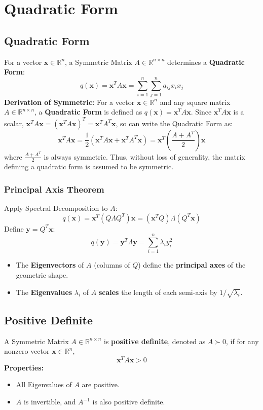 \documentclass{article}
\begin{document}
\newpage
\section{Quadratic Form}

\subsection{Quadratic Form}

For a vector $\mathbf{x} \in \mathbb{R}^n$, a Symmetric Matrix $A \in \mathbb{R}^{n \times n}$ determines a \textbf{Quadratic Form}:
\[
    q(\mathbf{x}) = \mathbf{x}^T A \mathbf{x} = \sum_{i=1}^n \sum_{j=1}^n a_{ij} x_i x_j
\]
\textbf{Derivation of Symmetric:}
\newline
For a vector $\mathbf{x} \in \mathbb{R}^n$ and any square matrix $A \in \mathbb{R}^{n \times n}$, a \textbf{Quadratic Form} is defined as $q(\mathbf{x}) = \mathbf{x}^T A \mathbf{x}$.
Since $\mathbf{x}^T A \mathbf{x}$ is a scalar, $\mathbf{x}^T A \mathbf{x} = (\mathbf{x}^T A \mathbf{x})^T = \mathbf{x}^T A^T \mathbf{x}$, so can write the Quadratic Form as:
\[
    \mathbf{x}^T A \mathbf{x} = \frac{1}{2} (\mathbf{x}^T A \mathbf{x} + \mathbf{x}^T A^T \mathbf{x}) = \mathbf{x}^T \left( \frac{A + A^T}{2} \right) \mathbf{x}
\]
where $\frac{A + A^T}{2}$ is always symmetric.
\newline
Thus, without loss of generality, the matrix defining a quadratic form is assumed to be symmetric.

\subsubsection{Principal Axis Theorem}
Apply Spectral Decomposition to $A$:
\[
    q(\mathbf{x}) = \mathbf{x}^T (Q \Lambda Q^T) \mathbf{x} = (\mathbf{x}^T Q) \Lambda (Q^T \mathbf{x})
\]
Define $\mathbf{y} = Q^T \mathbf{x}$:
\[
    q(\mathbf{y}) = \mathbf{y}^T \Lambda \mathbf{y} = \sum_{i=1}^n \lambda_i y_i^2
\]
\begin{itemize}
    \item The \textbf{Eigenvectors} of $A$ (columns of $Q$) define the \textbf{principal axes} of the geometric shape.
    \item The \textbf{Eigenvalues} $\lambda_i$ of $A$ \textbf{scales} the length of each semi-axis by $1/\sqrt{\lambda_i}$.
\end{itemize}

\subsection{Positive Definite}
A Symmetric Matrix $A \in \mathbb{R}^{n \times n}$ is \textbf{positive definite}, denoted as $A \succ 0$, if for any nonzero vector $\mathbf{x} \in \mathbb{R}^n$,
\[
    \mathbf{x}^T A \mathbf{x} > 0
\]
\textbf{Properties:}
\begin{itemize}
    \item All Eigenvalues of $A$ are positive.
    \item $A$ is invertible, and $A^{-1}$ is also positive definite.
\end{itemize}
\end{document}
